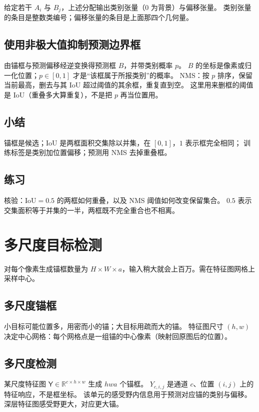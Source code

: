 给定若干 $A_i$ 与 $B_j$，上述分配输出类别张量（$0$ 为背景）与偏移张量。
类别张量的条目是整数类编号；偏移张量的条目是上面那四个几何量。

\subsection{使用非极大值抑制预测边界框}

由锚框与预测偏移经逆变换得预测框 $B$，并带类别概率 $p$。
$B$ 的坐标是像素或归一化位置；$p\in[0,1]$ 才是“该框属于所报类别”的概率。
NMS：按 $p$ 排序，保留当前最高，删去与其 IoU 超过阈值的其余框，重复直到空。
这里用来删框的阈值是 IoU（重叠多大算重复），不是把 $p$ 再当位置用。

\subsection{小结}

锚框是候选；IoU 是两框面积交集除以并集，在 $[0,1]$，$1$ 表示框完全相同；
训练标签是类别加位置偏移；预测用 NMS 去掉重叠框。

\subsection{练习}

核验：$\mathrm{IoU}=0.5$ 的两框如何重叠，以及 NMS 阈值如何改变保留集合。
$0.5$ 表示交集面积等于并集的一半，两框既不完全重合也不相离。

\section{多尺度目标检测}

对每个像素生成锚框数量为 $H\times W\times a$，输入稍大就会上百万。需在特征图网格上采样中心。

\subsection{多尺度锚框}

小目标可能位置多，用密而小的锚；大目标用疏而大的锚。
特征图尺寸 $(h,w)$ 决定中心网格：每个网格点是一组锚的中心像素（映射回原图后的位置）。

\subsection{多尺度检测}

某尺度特征图 $\mathsf{Y}\in\mathbb{R}^{c\times h\times w}$ 生成 $hwa$ 个锚框。
$Y_{c,i,j}$ 是通道 $c$、位置 $(i,j)$ 上的特征响应，不是框坐标。
该单元的感受野内信息用于预测对应锚的类别与偏移。
深层特征图感受野更大，对应更大锚。


